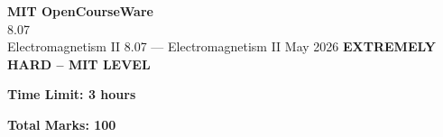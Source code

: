 \documentclass[12pt,a4paper]{exam}
\begin{document}
\begin{center}
{\LARGE \textbf{MIT OpenCourseWare}}\\8.07\\Electromagnetism II
\vspace{0.5cm}
{8.07} --- {Electromagnetism II}
\vspace{0.3cm}
May 2026
\vspace{0.3cm}
\textbf{EXTREMELY HARD -- MIT LEVEL}
\end{center}

\begin{center}
\textbf{Time Limit: 3 hours}
\end{center}

\begin{center}
\textbf{Total Marks: 100}
\end{center}

\vspace{0.5cm}
\end{document}
